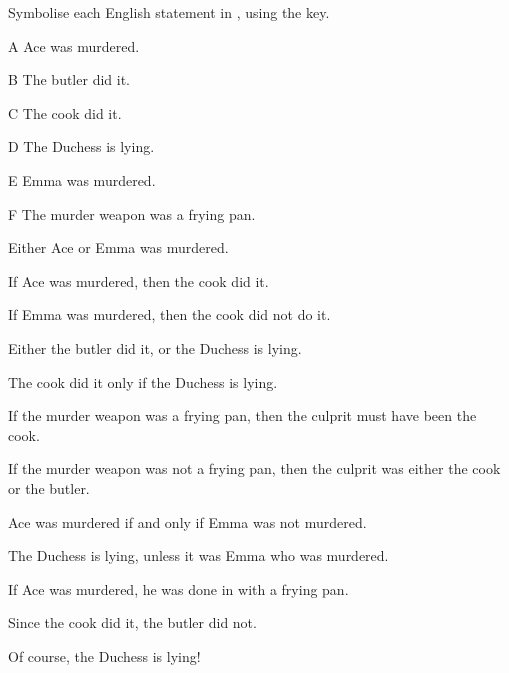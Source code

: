 \documentclass[PHIL101-Textbook.tex]{subfiles}
\begin{document}
\noindent\problempart Symbolise each English statement in \tfl, using the key.
\begin{ekey}
\item[A] Ace was murdered.
\item[B] The butler did it.
\item[C] The cook did it.
\item[D] The Duchess is lying.
\item[E] Emma was murdered.
\item[F] The murder weapon was a frying pan.
\end{ekey}
\begin{earg}
\item Either  Ace or Emma was murdered.
\item If  Ace was murdered, then the cook did it.
\item If Emma was murdered, then the cook did not do it.
\item Either the butler did it, or the Duchess is lying.
\item The cook did it only if the Duchess is lying.
\item If the murder weapon was a frying pan, then the culprit must have been the cook.
\item If the murder weapon was not a frying pan, then the culprit was either the cook or the butler.
\item Ace was murdered if and only if Emma was not murdered.
\item The Duchess is lying, unless it was Emma who was murdered.
\item If Ace was murdered, he was done in with a frying pan.
\item Since the cook did it, the butler did not.
\item Of course, the Duchess is lying!
\end{earg}

\pagebreak
\end{document}
